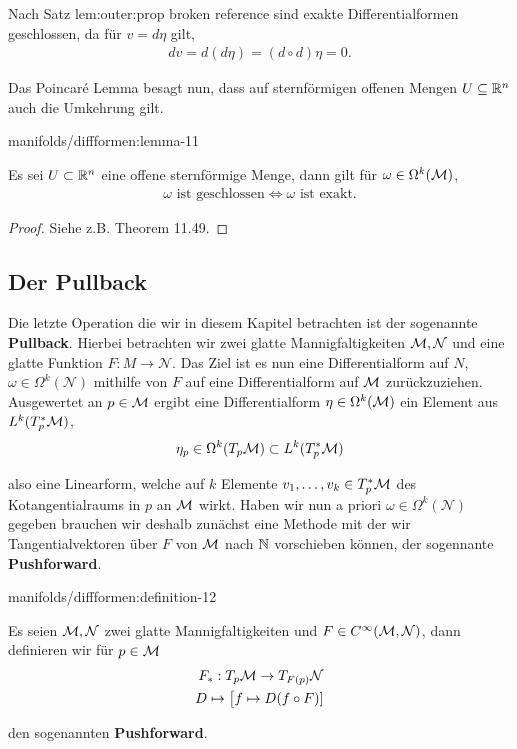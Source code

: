 \par
Nach Satz {lem:outer:prop broken reference} sind exakte Differentialformen geschlossen, da für \(v=d\eta\) gilt,
\begin{align*}
dv = d(d\eta) = (d\circ d)\eta = 0.
\end{align*}
\par
Das Poincaré Lemma besagt nun, dass auf sternförmigen offenen Mengen \(U\subseteq \mathbb{R}^n\) auch die Umkehrung gilt.
\begin{lemma}{}{manifolds/diffformen:lemma-11}



\par
Es sei \(U\subset\mathbb{R}^n\) eine offene sternförmige Menge, dann gilt für \(\omega\in \Omega^k(\mathcal{M})\),
\begin{align*}
\omega\text{ ist geschlossen}\Leftrightarrow \omega\text{ ist exakt.}
\end{align*}\end{lemma}

\begin{proof}
 Siehe z.B. \cite{Lee03} Theorem 11.49.
\end{proof}


\subsection{Der Pullback}
\label{\detokenize{manifolds/diffformen:der-pullback}}
\par
Die letzte Operation die wir in diesem Kapitel betrachten ist der sogenannte \textbf{Pullback}. Hierbei betrachten wir zwei glatte Mannigfaltigkeiten \(\mathcal{M},\mathcal{N}\) und eine glatte Funktion \(F:M\to\mathcal{N}\). Das Ziel ist es nun eine Differentialform auf \(N\), \(\omega\in\Omega^k(\mathcal{N})\) mithilfe von \(F\) auf eine Differentialform auf \(\mathcal{M}\) zurückzuziehen. Ausgewertet an \(p\in\mathcal{M}\) ergibt eine Differentialform \(\eta\in\Omega^k(\mathcal{M})\) ein Element aus \(L^k(T_p^\ast\mathcal{M})\),
\begin{align*}
\eta_p\in \Omega^k(T_p\mathcal{M}) \subset L^k(T_p^\ast\mathcal{M})
\end{align*}
\par
also eine Linearform, welche auf \(k\) Elemente \(v_1,\ldots,v_k\in T_p^\ast\mathcal{M}\) des Kotangentialraums in \(p\) an \(\mathcal{M}\) wirkt. Haben wir nun a priori \(\omega\in\Omega^k(\mathcal{N})\) gegeben brauchen wir deshalb zunächst eine Methode mit der wir Tangentialvektoren über \(F\) von \(\mathcal{M}\) nach \(\mathbb{N}\) vorschieben können, der sogennante \textbf{Pushforward}.
\begin{definition}{}{manifolds/diffformen:definition-12}



\par
Es seien \(\mathcal{M},\mathcal{N}\) zwei glatte Mannigfaltigkeiten und \(F\in C^\infty(\mathcal{M},\mathcal{N})\), dann definieren wir für \(p\in\mathcal{M}\)
\begin{align*}
F_\ast:T_p\mathcal{M}\to T_{F(p)}\mathcal{N}\\
D\mapsto \big[f\mapsto D(f\circ F)]
\end{align*}
\par
den sogenannten \textbf{Pushforward}.
\end{definition}

